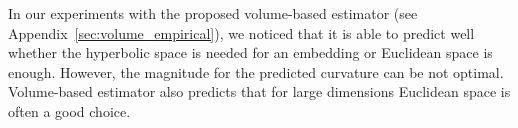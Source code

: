 \documentclass{article} %
\begin{document}
In our experiments with the proposed volume-based estimator (see Appendix~\ref{sec:volume_empirical}), we noticed that it is able to predict well whether the hyperbolic space is needed for an embedding or Euclidean space is enough. However, the magnitude for the predicted curvature can be not optimal. Volume-based estimator also predicts that for large dimensions Euclidean space is often a good choice.


\end{document}
